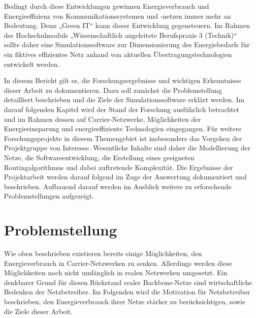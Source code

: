 \documentclass[12pt,titlepage]{article}
\begin{document}
 
Bedingt durch diese Entwicklungen gewinnen Energieverbrauch und Energieeffizienz von Kommunikationssystemen und -netzen immer mehr an Bedeutung. Denn „Green IT“ kann dieser Entwicklung gegensteuern. Im Rahmen des Hochschulmoduls „Wissenschaftlich angeleitete Berufspraxis 3 (Technik)“ sollte daher eine Simulationssoftware zur Dimensionierung des Energiebedarfs für ein fiktives effizientes Netz anhand von aktuellen Übertragungstechnologien entwickelt werden. 


In diesem Bericht gilt es, die Forschungsergebnisse und wichtigen Erkenntnisse dieser Arbeit zu dokumentieren. Dazu soll zunächst die Problemstellung detailliert beschrieben und die Ziele der Simulationssoftware erklärt werden. Im darauf folgenden Kapitel wird der Stand der Forschung ausführlich betrachtet und im Rahmen dessen auf Carrier-Netzwerke, Möglichkeiten der Energieeinsparung und energieeffiziente Technologien eingegangen. Für weitere Forschungsprojekte in diesem Themengebiet ist insbesondere das Vorgehen der Projektgruppe von Interesse. Wesentliche Inhalte sind daher die Modellierung der Netze, die Softwareentwicklung, die Erstellung eines geeigneten Routingalgorithmus und dabei auftretende Komplexität. Die Ergebnisse der Projektarbeit werden darauf folgend im Zuge der Auswertung dokumentiert und beschrieben. Aufbauend darauf werden im Ausblick weitere zu erforschende Problemstellungen aufgezeigt. 




\section{Problemstellung}
Wie oben beschrieben existieren bereits einige Möglichkeiten, den Energieverbrauch in Carrier-Netzwerken zu senken. Allerdings werden diese Möglichkeiten noch nicht umfänglich in realen Netzwerken umgesetzt. Ein denkbarer Grund für diesen Rückstand realer Backbone-Netze sind wirtschaftliche Bedenken der Netzbetreiber. Im Folgenden wird die Motivation für Netzbetreiber beschrieben, den Energieverbrauch ihrer Netze stärker zu berücksichtigen, sowie die Ziele dieser Arbeit.
\end{document}
